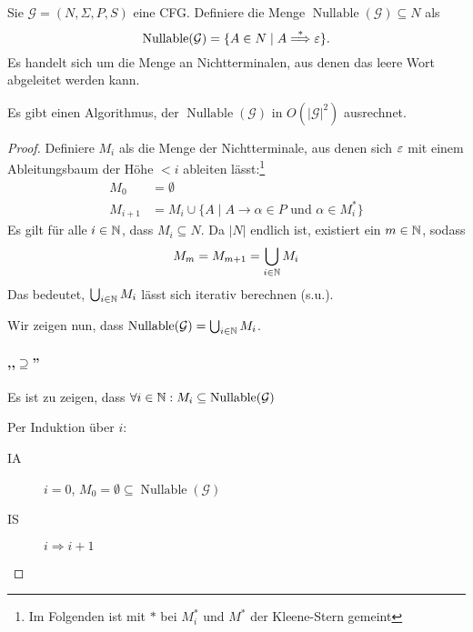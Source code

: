 {\begin{Def}
  Sie $\mathcal{G} = (N, \Sigma, P, S)$ eine CFG.
  Definiere die Menge $\operatorname{Nullable}(\mathcal{G}) \subseteq N$ als
  \begin{displaymath}
    \operatorname{Nullable}(\mathcal{G}) = \{ A \in N \mid A
    \stackrel{*}{\==>} \Eps \}
    \text{.}
  \end{displaymath}
  Es handelt sich um die Menge an Nichtterminalen, aus denen das leere Wort abgeleitet werden kann.
\end{Def}

\begin{Satz}
  Es gibt einen Algorithmus, der $\operatorname{Nullable}(\mathcal{G})$ in $O(|\mathcal{G}|^2)$ ausrechnet.
\end{Satz}
\begin{proof}
  Definiere $M_i$ als die Menge der Nichtterminale, aus denen sich
  $\varepsilon$ mit einem Ableitungsbaum der Höhe $< i$ ableiten lässt:\footnote{
  Im Folgenden ist mit $*$ bei $M_i^*$ und $M^*$ der Kleene-Stern gemeint} 
  \begin{align*}
    M_0 &= \emptyset \\
    M_{i+1} &= M_i \cup \{ A \mid A \to \alpha \in P \text{ und }
              \alpha \in M_i^* \}
  \end{align*}
  Es gilt für alle $i \in \mathbb{N}$, dass $M_i \subseteq N$.
  Da $|N|$ endlich ist, existiert ein $m \in \mathbb{N}$, sodass
  \begin{displaymath}
    M_m = M_{m+1} = \bigcup_{i \in \mathbb{N}} M_i
  \end{displaymath}
  Das bedeutet, $\bigcup_{i \in \mathbb{N}} M_i$ lässt sich iterativ berechnen (s.u.).

  Wir zeigen nun, dass $\operatorname{Nullable}(\mathcal{G}) = \bigcup_{i \in \mathbb{N}} M_i$.

  \paragraph{,,$\supseteq$''}
  Es ist zu zeigen, dass $\forall i \in \mathbb{N}: M_i \subseteq \operatorname{Nullable}(\mathcal{G})$

  Per Induktion über $i$:
  \begin{description}
  \item[IA] $i = 0$, $M_0 = \emptyset \subseteq \operatorname{Nullable}(\mathcal{G})$
  \item[IS] $i \Rightarrow i+1$


\end{description}
\end{proof}}
